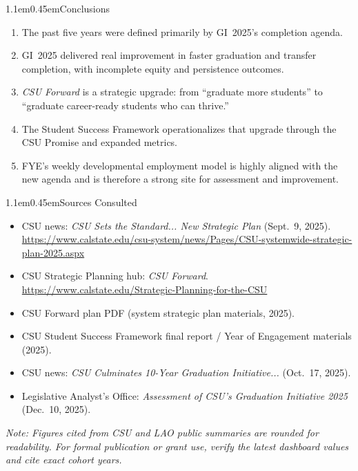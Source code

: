 \documentclass[11pt,letterpaper]{article}
\makeatletter
\renewcommand\section{\@startsection{section}{1}{\z@}%
  {1.1em}{0.45em}{\large\bfseries}}
\makeatother
\begin{document}
\section{Conclusions}
\begin{enumerate}
  \item The past five years were defined primarily by GI~2025's completion agenda.
  \item GI~2025 delivered real improvement in faster graduation and transfer completion, with incomplete equity and persistence outcomes.
  \item \textit{CSU Forward} is a strategic upgrade: from ``graduate more students'' to ``graduate career-ready students who can thrive.''
  \item The Student Success Framework operationalizes that upgrade through the CSU Promise and expanded metrics.
  \item FYE's weekly developmental employment model is highly aligned with the new agenda and is therefore a strong site for assessment and improvement.
\end{enumerate}

\section{Sources Consulted}
\begin{itemize}
  \item CSU news: \textit{CSU Sets the Standard... New Strategic Plan} (Sept.~9, 2025).\\
  \url{https://www.calstate.edu/csu-system/news/Pages/CSU-systemwide-strategic-plan-2025.aspx}
  \item CSU Strategic Planning hub: \textit{CSU Forward}.\\
  \url{https://www.calstate.edu/Strategic-Planning-for-the-CSU}
  \item CSU Forward plan PDF (system strategic plan materials, 2025).
  \item CSU Student Success Framework final report / Year of Engagement materials (2025).
  \item CSU news: \textit{CSU Culminates 10-Year Graduation Initiative...} (Oct.~17, 2025).
  \item Legislative Analyst's Office: \textit{Assessment of CSU's Graduation Initiative 2025} (Dec.~10, 2025).
\end{itemize}

\vspace{1.2em}
{\footnotesize\textit{Note: Figures cited from CSU and LAO public summaries are rounded for readability. For formal publication or grant use, verify the latest dashboard values and cite exact cohort years.}}
\end{document}
